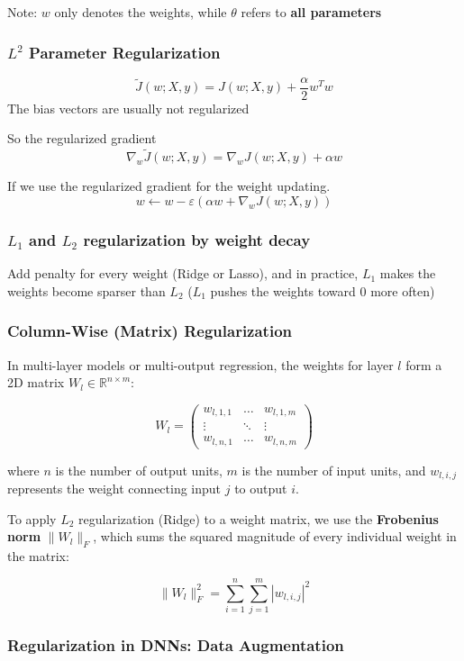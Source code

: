\documentclass{article}
\begin{document}
Note: $w$ only denotes the weights, while $\theta$ refers to \textbf{all parameters}

\subsubsection{$L^2$ Parameter Regularization}
\[\tilde{J}(w; X , y) = J(w; X,y) + \frac{\alpha}{2}w^T w\]
The bias vectors are usually not regularized

So the regularized gradient
\[\nabla_w \tilde{J}(w; X, y) = \nabla_w J(w; X,y) + \alpha w\]

If we use the regularized gradient for the weight updating.
\[w \leftarrow w - \varepsilon(\alpha w + \nabla_wJ(w; X,y))\]
\subsubsection{$L_1$ and $L_2$ regularization by weight decay}
Add penalty for every weight (Ridge or Lasso), and in practice, $L_1$ makes the weights become sparser than $L_2$ ($L_1$ pushes the weights toward 0 more often)

\subsubsection{Column-Wise (Matrix) Regularization}
In multi-layer models or multi-output regression, the weights for layer $l$ form a 2D matrix $W_l \in \mathbb{R}^{n \times m}$:

\[
W_l = \begin{pmatrix}
  w_{l,1,1} & \dots & w_{l,1,m} \\
  \vdots & \ddots & \vdots \\
  w_{l,n,1} & \dots & w_{l,n,m}
\end{pmatrix}
\]

where $n$ is the number of output units, $m$ is the number of input units, and $w_{l,i,j}$ represents the weight connecting input $j$ to output $i$.

To apply $L_2$ regularization (Ridge) to a weight matrix, we use the \textbf{Frobenius norm} $\|W_l\|_F$, which sums the squared magnitude of every individual weight in the matrix:

\[
\|W_l\|_F^2 = \sum_{i=1}^n \sum_{j=1}^m |w_{l,i,j}|^2
\]

\subsubsection{Regularization in DNNs: Data Augmentation}
\end{document}
